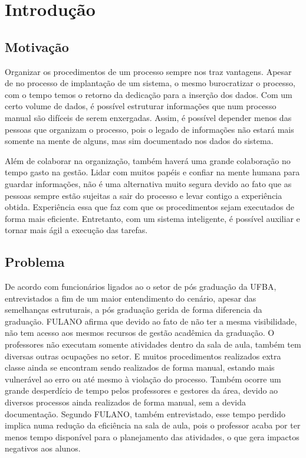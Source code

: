 \chapter{Introdução}

\section{Motivação}

Organizar os procedimentos de um processo sempre nos traz vantagens. Apesar de no processo de implantação de um sistema, o mesmo burocratizar o processo, com o tempo temos o retorno da dedicação para a inserção dos dados. Com um certo volume de dados, é possível estruturar informações que num processo manual são difíceis de serem enxergadas. Assim, é possível depender menos das pessoas que organizam o processo, pois o legado de informações não estará mais somente na mente de alguns, mas sim documentado nos dados do sistema.

Além de colaborar na organização, também haverá uma grande colaboração no tempo gasto na gestão. Lidar com muitos papéis e confiar na mente humana para guardar informações, não é uma alternativa muito segura devido ao fato que as pessoas sempre estão sujeitas a sair do processo e levar contigo a experiência obtida. Experiência essa que faz com que os procedimentos sejam executados de forma mais eficiente. Entretanto, com um sistema inteligente, é possível auxiliar e tornar mais ágil a execução das tarefas.


\section{Problema}


De acordo com funcionários ligados ao o setor de pós graduação da UFBA, entrevistados a fim de um maior entendimento do cenário, apesar das semelhanças estruturais, a pós graduação gerida de forma diferencia da graduação. FULANO afirma que devido ao fato de não ter a mesma visibilidade, não tem acesso aos mesmos recursos de gestão acadêmica da graduação. O professores não executam somente atividades dentro da sala de aula, também tem diversas outras ocupações no setor. E muitos procedimentos realizados extra classe ainda se encontram sendo realizados de forma manual, estando mais vulnerável ao erro ou até mesmo à violação do processo. Também ocorre um grande desperdício de tempo pelos professores e gestores da área, devido ao diversos processos ainda realizados de forma manual, sem a devida documentação. Segundo FULANO, também entrevistado, esse tempo perdido implica numa redução da eficiência na sala de aula, pois o professor acaba por ter menos tempo disponível para o planejamento das atividades, o que gera impactos negativos aos alunos.


